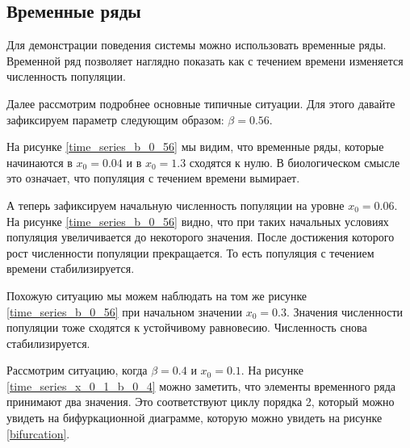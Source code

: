 \subsection{Временные ряды}

    Для демонстрации поведения системы можно использовать временные ряды. Временной ряд позволяет наглядно показать как с течением времени изменяется численность популяции.

    Далее рассмотрим подробнее основные типичные ситуации. Для этого давайте зафиксируем параметр следующим образом: \(\beta = 0.56\). 

    На рисунке \ref{time_series_b_0_56} мы видим, что временные ряды, которые начинаются в \(x_0 = 0.04\) и в \(x_0 = 1.3\) сходятся к нулю. В биологическом смысле это означает, что популяция с течением времени вымирает.

    А теперь зафиксируем начальную численность популяции на уровне \(x_0 = 0.06\). На рисунке \ref{time_series_b_0_56} видно, что при таких начальных условиях популяция увеличивается до некоторого значения. После достижения которого рост численности популяции прекращается. То есть популяция с течением времени стабилизируется.

    Похожую ситуацию мы можем наблюдать на том же рисунке \ref{time_series_b_0_56} при начальном значении \(x_0 = 0.3\). Значения численности популяции тоже сходятся к устойчивому равновесию. Численность снова стабилизируется.
    


    Рассмотрим ситуацию, когда \(\beta = 0.4\) и \(x_0 = 0.1\). На рисунке \ref{time_series_x_0_1_b_0_4} можно заметить, что элементы временного ряда принимают два значения. Это соответствуют циклу порядка 2, который можно увидеть на бифуркационной диаграмме, которую можно увидеть на рисунке \ref{bifurcation}.
    

